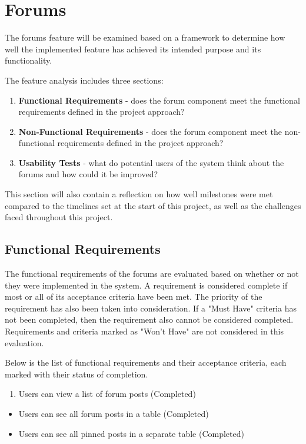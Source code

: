 \section{Forums}

The forums feature will be examined based on a framework to determine how well the implemented feature has achieved its intended purpose and its functionality.

The feature analysis includes three sections:

\begin{enumerate}
    \item \textbf{Functional Requirements} - does the forum component meet the functional requirements defined in the project approach?
    \item \textbf{Non-Functional Requirements} - does the forum component meet the non-functional requirements defined in the project approach?
    \item \textbf{Usability Tests} - what do potential users of the system think about the forums and how could it be improved?
\end{enumerate}

This section will also contain a reflection on how well milestones were met compared to the timelines set at the start of this project, as well as the challenges faced throughout this project.

\subsection{Functional Requirements}
The functional requirements of the forums are evaluated based on whether or not they were implemented in the system.
A requirement is considered complete if most or all of its acceptance criteria have been met.
The priority of the requirement has also been taken into consideration.
If a "Must Have" criteria has not been completed, then the requirement also cannot be considered completed.
Requirements and criteria marked as "Won't Have" are not considered in this evaluation.

Below is the list of functional requirements and their acceptance criteria, each marked with their status of completion.

\begin{enumerate}
    \item Users can view a list of forum posts (Completed)
\end{enumerate}
\begin{itemize}
    \setlength{\itemindent}{1.5em}
    \item Users can see all forum posts in a table (Completed)
    \item Users can see all pinned posts in a separate table (Completed)
\end{itemize}

